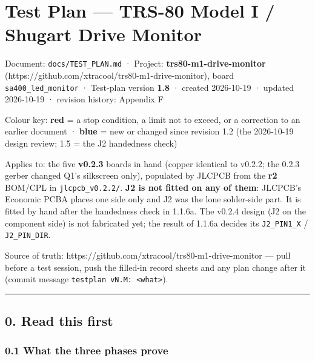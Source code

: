 \documentclass[
  10pt,
  twoside]{article}
\author{}
\date{}
\begin{document}
\hypertarget{test-plan-trs-80-model-i-shugart-drive-monitor}{%
\section{Test Plan --- TRS-80 Model I / Shugart Drive
Monitor}\label{test-plan-trs-80-model-i-shugart-drive-monitor}}

Document: \texttt{docs/TEST\_PLAN.md} · Project:
\textbf{trs80-m1-drive-monitor}
(https://github.com/xtracool/trs80-m1-drive-monitor), board
\texttt{sa400\_led\_monitor} · Test-plan version
\textbf{1.8} · created 2026-10-19 · updated 2026-10-19 ·
revision history: Appendix F

Colour key: \textcolor[HTML]{B00000}{\textbf{red} = a stop
condition, a limit not to exceed, or a correction to an
earlier document} · \textcolor[HTML]{0040A0}{\textbf{blue} =
new or changed since revision 1.2 (the 2026-10-19 design
review; 1.5 = the J2 handedness check)}

Applies to: the five \textbf{v0.2.3} boards in hand (copper
identical to v0.2.2; the 0.2.3 gerber changed Q1's
silkscreen only), populated by JLCPCB from the \textbf{r2}
BOM/CPL in \texttt{jlcpcb\_v0.2.2/}.
\textcolor[HTML]{0040A0}{\textbf{J2 is not fitted on any of
them}: JLCPCB's Economic PCBA places one side only and J2
was the lone solder-side part. It is fitted by hand after
the handedness check in 1.1.6a. The v0.2.4 design (J2 on the
component side) is not fabricated yet; the result of 1.1.6a
decides its \texttt{J2\_PIN1\_X} / \texttt{J2\_PIN\_DIR}.}

Source of truth:
https://github.com/xtracool/trs80-m1-drive-monitor --- pull
before a test session, push the filled-in record sheets and
any plan change after it (commit message
\texttt{testplan\ vN.M:\ \textless{}what\textgreater{}}).

\begin{center}\rule{0.5\linewidth}{0.5pt}\end{center}

\hypertarget{read-this-first}{%
\subsection{0. Read this first}\label{read-this-first}}

\hypertarget{what-the-three-phases-prove}{%
\subsubsection{0.1 What the three phases
prove}\label{what-the-three-phases-prove}}
\end{document}
